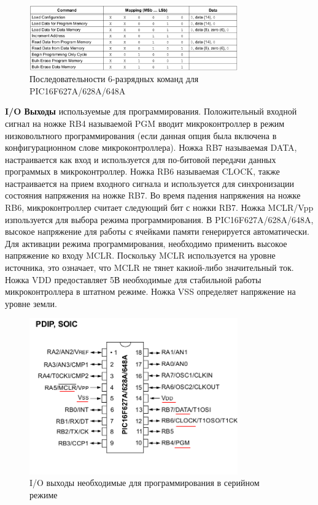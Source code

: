 \begin{figure}[h!]
    \centering
    \includegraphics[width=0.8\textwidth]{2017-05-08_at_03:31:35_screenshot.png}
    \caption{Последовательности 6-разрядных команд для PIC16F627A/628A/648A}
\end{figure}

\textbf{I/O Выходы} используемые для программирования. Положительный входной сигнал на ножке RB4 называемой PGM вводит микроконтроллер в режим низковольтного программирования (если данная опция была включена в конфигурационном слове микроконтроллера). Ножка RB7 называемая DATA, настраивается как вход и используется для по-битовой передачи данных программых в микроконтроллер. Ножка RB6 называемая CLOCK, также настраивается на прием входного сигнала и используется для синхронизации состояния напряжения на ножке RB7. Во время падения напряжения на ножке RB6, микроконтроллер считает следующий бит с ножки RB7. Ножка MCLR/Vpp изпользуется для выбора режима программирования. В PIC16F627A/628A/648A, высокое напряжение для работы с ячейками памяти генерируется автоматически. Для активации
режима программирования, необходимо применить высокое напряжение ко входу MCLR. Поскольку MCLR используется на уровне источника, это означает, что MCLR не тянет какиой-либо значительный ток. Ножка VDD предоставляет 5В необходимые для стабильной работы микроконтроллера в штатном режиме. Ножка VSS определяет напряжение на уровне земли.

\begin{figure}[h!]
    \centering
    \includegraphics[width=0.8\textwidth]{2017-05-07_at_22:31:52_screenshot.png}
    \caption{I/O выходы необходимые для программирования в серийном режиме}
\end{figure}


